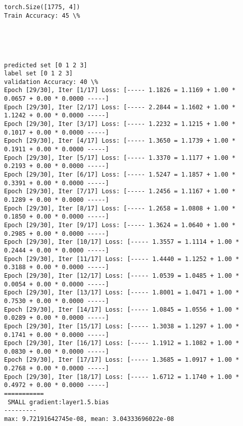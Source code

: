 \documentclass[11pt]{article}
\begin{document}
    \begin{Verbatim}[commandchars=\\\{\}]
torch.Size([1775, 4])
Train Accuracy: 45 \%

    \end{Verbatim}

    \begin{center}
    \end{center}
    { \hspace*{\fill} \\}
    
    \begin{center}
    \end{center}
    { \hspace*{\fill} \\}
    
    \begin{Verbatim}[commandchars=\\\{\}]
predicted set [0 1 2 3]
label set [0 1 2 3]
validation Accuracy: 40 \%
Epoch [29/30], Iter [1/17] Loss: [----- 1.1826 = 1.1169 + 1.00 * 0.0657 + 0.00 * 0.0000 -----]
Epoch [29/30], Iter [2/17] Loss: [----- 2.2844 = 1.1602 + 1.00 * 1.1242 + 0.00 * 0.0000 -----]
Epoch [29/30], Iter [3/17] Loss: [----- 1.2232 = 1.1215 + 1.00 * 0.1017 + 0.00 * 0.0000 -----]
Epoch [29/30], Iter [4/17] Loss: [----- 1.3650 = 1.1739 + 1.00 * 0.1911 + 0.00 * 0.0000 -----]
Epoch [29/30], Iter [5/17] Loss: [----- 1.3370 = 1.1177 + 1.00 * 0.2193 + 0.00 * 0.0000 -----]
Epoch [29/30], Iter [6/17] Loss: [----- 1.5247 = 1.1857 + 1.00 * 0.3391 + 0.00 * 0.0000 -----]
Epoch [29/30], Iter [7/17] Loss: [----- 1.2456 = 1.1167 + 1.00 * 0.1289 + 0.00 * 0.0000 -----]
Epoch [29/30], Iter [8/17] Loss: [----- 1.2658 = 1.0808 + 1.00 * 0.1850 + 0.00 * 0.0000 -----]
Epoch [29/30], Iter [9/17] Loss: [----- 1.3624 = 1.0640 + 1.00 * 0.2985 + 0.00 * 0.0000 -----]
Epoch [29/30], Iter [10/17] Loss: [----- 1.3557 = 1.1114 + 1.00 * 0.2444 + 0.00 * 0.0000 -----]
Epoch [29/30], Iter [11/17] Loss: [----- 1.4440 = 1.1252 + 1.00 * 0.3188 + 0.00 * 0.0000 -----]
Epoch [29/30], Iter [12/17] Loss: [----- 1.0539 = 1.0485 + 1.00 * 0.0054 + 0.00 * 0.0000 -----]
Epoch [29/30], Iter [13/17] Loss: [----- 1.8001 = 1.0471 + 1.00 * 0.7530 + 0.00 * 0.0000 -----]
Epoch [29/30], Iter [14/17] Loss: [----- 1.0845 = 1.0556 + 1.00 * 0.0289 + 0.00 * 0.0000 -----]
Epoch [29/30], Iter [15/17] Loss: [----- 1.3038 = 1.1297 + 1.00 * 0.1741 + 0.00 * 0.0000 -----]
Epoch [29/30], Iter [16/17] Loss: [----- 1.1912 = 1.1082 + 1.00 * 0.0830 + 0.00 * 0.0000 -----]
Epoch [29/30], Iter [17/17] Loss: [----- 1.3685 = 1.0917 + 1.00 * 0.2768 + 0.00 * 0.0000 -----]
Epoch [29/30], Iter [18/17] Loss: [----- 1.6712 = 1.1740 + 1.00 * 0.4972 + 0.00 * 0.0000 -----]
===========
 SMALL gradient:layer1.5.bias
---------
max: 9.72191642745e-08, mean: 3.04333696022e-08

    \end{Verbatim}
\end{document}
